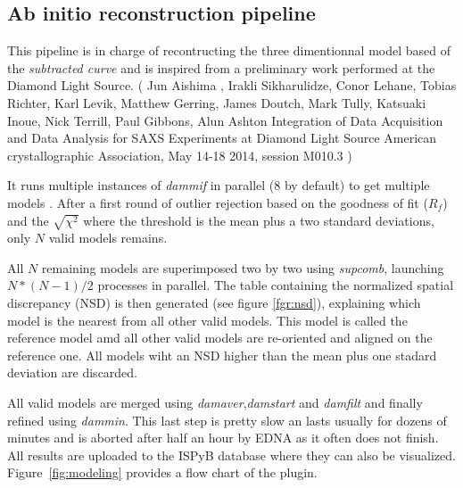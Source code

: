 \documentclass[preprint,pdf]{iucr}              %
\begin{document}
\subsection{Ab initio reconstruction pipeline}

This pipeline is in charge of recontructing the three dimentionnal model based
of the \textit{subtracted curve} and is inspired from a preliminary work
performed at the Diamond Light Source.
(
Jun Aishima , Irakli Sikharulidze, Conor Lehane, Tobias Richter, Karl Levik,
Matthew Gerring, James Doutch, Mark Tully, Katsuaki Inoue, Nick Terrill, Paul Gibbons, Alun Ashton
Integration of Data Acquisition and Data Analysis for SAXS Experiments at Diamond Light Source
American crystallographic Association, May 14-18 2014, session M010.3
)

It runs multiple instances of \textit{dammif} in parallel (8 by default) to get
multiple models \cite{dammif}.
After a first round of outlier rejection based on the goodness of fit ($R_{f}$) and the
$\sqrt{\chi^{2}}$  where the threshold is the mean plus a two standard
deviations, only $N$ valid models remains.



All $N$ remaining models are superimposed two by two using
\textit{supcomb}\cite{supcomb}, launching $N*(N-1)/2$ processes in parallel.
The table containing the normalized spatial discrepancy (NSD) is then generated
(see figure \ref{fgr:nsd}), explaining which model is the nearest from all other
valid models. This model is called the reference model amd all other valid
models are re-oriented and aligned on the reference one. All models wiht an NSD higher than the mean plus one stadard deviation are discarded.


All valid models are merged using \textit{damaver}\cite{damaver},\textit{damstart} and
\textit{damfilt} and finally refined using \textit{dammin}\cite{dammin}.
This last step is pretty slow an lasts usually for dozens of minutes and is
aborted after half an hour by EDNA as it often does not finish. All results are
uploaded to the ISPyB database where they can also be visualized. Figure~\ref{fig:modeling} provides a flow chart of the plugin.
\end{document}
